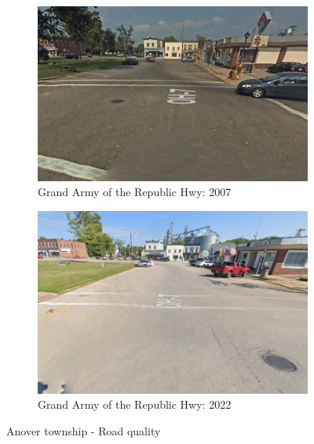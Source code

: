 \begin{figure}[htbp]
    \centering
    \begin{minipage}[b]{0.49\textwidth}
        \centering
        \begin{subfigure}[b]{\textwidth}
            \centering
            \includegraphics[width=\textwidth,keepaspectratio]{images/andover_township_14grandarmy_2007.png}
            \caption{Grand Army of the Republic Hwy: 2007
            \label{fig:andover_2007}}
        \end{subfigure}
    \end{minipage}
    \hfill
    \begin{minipage}[b]{0.49\textwidth}
        \centering
        \begin{subfigure}[b]{\textwidth}
            \centering
            \includegraphics[width=\textwidth,keepaspectratio]{images/andover_township_14grandarmy_2022.png}
            \caption{Grand Army of the Republic Hwy: 2022}
            \label{fig:andover_2022}
        \end{subfigure}
    \end{minipage}

    \vspace{1em}

    \caption{Anover township - Road quality}
    \label{fig:rd_andover}
\end{figure}

